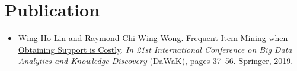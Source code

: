 \documentclass[10pt, oneside]{article}
\begin{document}
\begin{comment}
\section*{Certificate}
\begin{tabular}{p{2.1cm}|p{13cm}}	
	\toprule 
	Hong Kong Statistical Society & Higher Certificate\\
	& \footnotesize{TODO}
\end{tabular}
\end{comment}

\section*{Publication}
\begin{itemize}
	\item Wing-Ho Lin and Raymond Chi-Wing Wong. \href{https://link.springer.com/chapter/10.1007/978-3-030-27520-4_4}{Frequent Item Mining when Obtaining Support is Costly}. \textit{In 21st International Conference on Big Data Analytics and Knowledge Discovery} (DaWaK), pages 37--56. Springer, 2019.	
	
\end{itemize}
\end{document}

